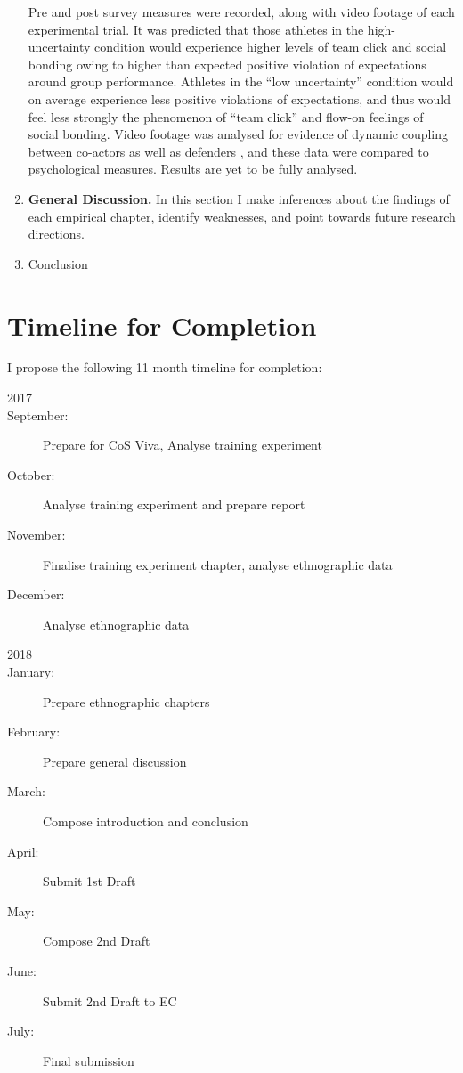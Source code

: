 \begin{enumerate}
  Pre and post survey measures were recorded, along with video footage of each experimental trial.  It was predicted that those athletes in the high-uncertainty condition would experience higher levels of team click and social bonding owing to higher than expected positive violation of expectations around group performance.
  Athletes in the ``low uncertainty'' condition would on average experience less positive violations of expectations, and thus would feel less strongly the phenomenon of ``team click'' and flow-on feelings of social bonding.  Video footage was analysed for evidence of dynamic coupling between co-actors as well as defenders \citep{Schmidt2011,Richardson2012,Passos2012}, and these data were compared to psychological measures.  Results are yet to be fully analysed.
  \item \textbf{General Discussion.}  In this section I make inferences about the findings of each empirical chapter, identify weaknesses, and point towards future research directions.
  \item Conclusion
\end{enumerate}

\clearpage
\section{Timeline for Completion}
I propose the following 11 month timeline for completion:\\


\begin{description}
  \item [2017]
    \item [September:] Prepare for CoS Viva, Analyse training experiment
    \item [October:] Analyse training experiment and prepare report
    \item [November:] Finalise training experiment chapter, analyse ethnographic data
    \item [December:] Analyse ethnographic data\\
  \end{description}

  \begin{description}
    \item [2018]
    \item [January:] Prepare ethnographic chapters
    \item [February:] Prepare general discussion
    \item [March:] Compose introduction and conclusion
    \item [April:] Submit 1st Draft
    \item [May:] Compose 2nd Draft
    \item [June:] Submit 2nd Draft to EC
    \item [July:] Final submission
  \end{description}



